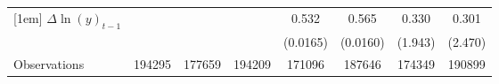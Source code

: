{\begin{tabular}{l*{7}{c}}
[1em]
$\Delta \ln(y)_{t-1}$&                  &                  &                  &    0.532\sym{***}&    0.565\sym{***}&    0.330         &    0.301         \\
          &                  &                  &                  & (0.0165)         & (0.0160)         &  (1.943)         &  (2.470)         \\
\hline
Observations&   194295         &   177659         &   194209         &   171096         &   187646         &   174349         &   190899         \\
\hline\hline
\end{tabular}
}
